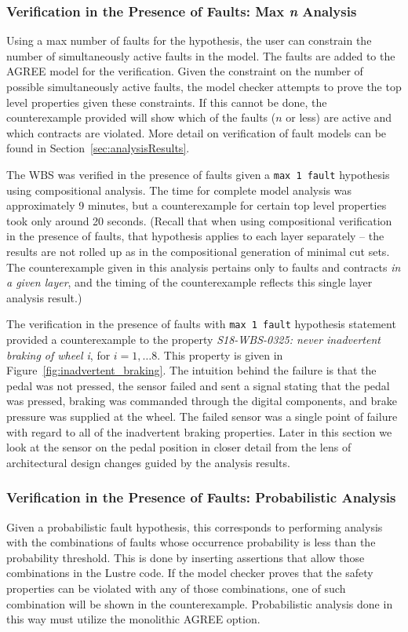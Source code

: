 \subsubsection{Verification in the Presence of Faults: Max \textit{n} Analysis}
Using a max number of faults for the hypothesis, the user can constrain the number of simultaneously active faults in the model. The faults are added to the AGREE model for the verification. Given the constraint on the number of possible simultaneously active faults, the model checker attempts to prove the top level properties given these constraints. If this cannot be done, the counterexample provided will show which of the faults ($n$ or less) are active and which contracts are violated. More detail on verification of fault models can be found in Section~\ref{sec:analysisResults}. 

The WBS was verified in the presence of faults given a \texttt{max 1 fault} hypothesis using compositional analysis. The time for complete model analysis was approximately 9 minutes, but a counterexample for certain top level properties took only around 20 seconds. (Recall that when using compositional verification in the presence of faults, that hypothesis applies to each layer separately -- the results are not rolled up as in the compositional generation of minimal cut sets. The counterexample given in this analysis pertains only to faults and contracts \textit{in a given layer}, and the timing of the counterexample reflects this single layer analysis result.) 

The verification in the presence of faults with \texttt{max 1 fault} hypothesis statement provided a counterexample to the property {\em S18-WBS-0325: never inadvertent braking of wheel i}, for $i = 1, \dots 8$. This property is given in Figure~\ref{fig:inadvertent_braking}. The intuition behind the failure is that the pedal was not pressed, the sensor failed and sent a signal stating that the pedal was pressed, braking was commanded through the digital components, and brake pressure was supplied at the wheel. The failed sensor was a single point of failure with regard to all of the inadvertent braking properties. Later in this section we look at the sensor on the pedal position in closer detail from the lens of architectural design changes guided by the analysis results. 

\subsubsection{Verification in the Presence of Faults: Probabilistic Analysis} 
Given a probabilistic fault hypothesis, this corresponds to performing analysis with the combinations of faults whose occurrence probability is less than the probability threshold. This is done by inserting assertions that allow those combinations in the Lustre code. If the model checker proves that the safety properties can be violated with any of those combinations, one of such combination will be shown in the counterexample. Probabilistic analysis done in this way must utilize the monolithic AGREE option. 

